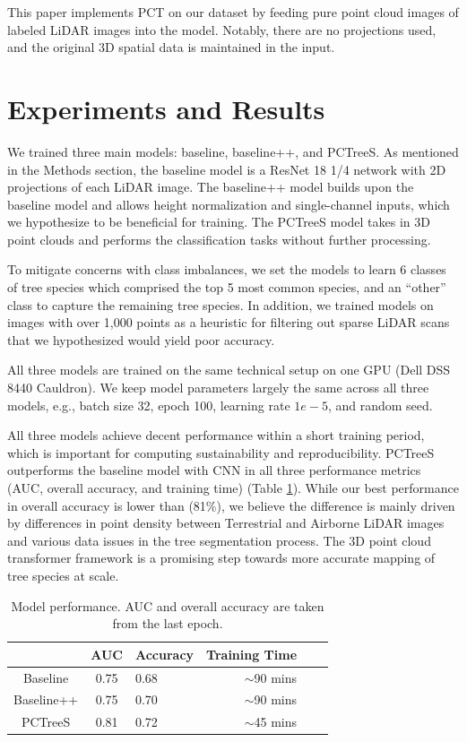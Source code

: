 \documentclass[letterpaper]{article} %
\begin{document}
This paper implements PCT on our dataset by feeding pure point cloud images of labeled LiDAR images into the model. Notably, there are no projections used, and the original 3D spatial data is maintained in the input.

\section{Experiments and Results}

We trained three main models: baseline, baseline++, and PCTreeS. As mentioned in the Methods section, the baseline model is a ResNet 18 1/4 network with 2D projections of each LiDAR image. The baseline++ model builds upon the baseline model and allows height normalization and single-channel inputs, which we hypothesize to be beneficial for training. The PCTreeS model takes in 3D point clouds and performs the classification tasks without further processing.

To mitigate concerns with class imbalances, we set the models to learn 6 classes of tree species which comprised the top 5 most common species, and an ``other'' class to capture the remaining tree species. In addition, we trained models on images with over 1,000 points as a heuristic for filtering out sparse LiDAR scans that we hypothesized would yield poor accuracy.  

All three models are trained on the same technical setup on one GPU (Dell DSS 8440 Cauldron). We keep model parameters largely the same across all three models, e.g., batch size 32, epoch 100, learning rate $1e-5$, and random seed. 

All three models achieve decent performance within a short training period, which is important for computing sustainability and reproducibility. PCTreeS outperforms the baseline model with CNN in all three performance metrics (AUC, overall accuracy, and training time) (Table \ref{table:performance}). While our best performance in overall accuracy is lower than \citealt{allen} (81\%), we believe the difference is mainly driven by differences in point density between Terrestrial and Airborne LiDAR images and various data issues in the tree segmentation process. The 3D point cloud transformer framework is a promising step towards more accurate mapping of tree species at scale.

\begin{table}[t]
\centering
\begin{tabular}{cclrcc}\toprule
      & \multicolumn{1}{c}{AUC} & \multicolumn{1}{c}{Accuracy} & \multicolumn{1}{c}{Training Time} \\ \midrule
    Baseline & 0.75 & 0.68 & $\sim$90 mins \\
    Baseline++ & 0.75 & 0.70 & $\sim$90 mins \\
    PCTreeS & 0.81 & 0.72 & $\sim$45 mins\\
    \bottomrule
\end{tabular}
\caption{Model performance. AUC and overall accuracy are taken from the last epoch.}
\label{table:performance}
\end{table}
\end{document}
